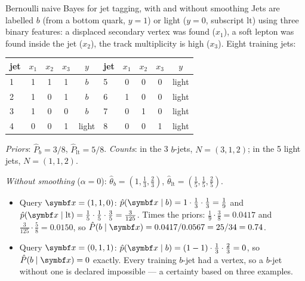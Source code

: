 \documentclass[11pt]{article}
\begin{document}
\begin{worked}{Bernoulli naive Bayes for jet tagging, with and without smoothing}
Jets are labelled $b$ (from a bottom quark, $y = 1$) or light ($y = 0$, subscript $\mathrm{lt}$) using three binary features: a displaced
secondary vertex was found ($x_1$), a soft lepton was found inside the jet ($x_2$), the track multiplicity is high
($x_3$). Eight training jets:

\begin{center}\small
\begin{tabular}{@{}lcccc@{\qquad}lcccc@{}}\toprule
jet & $x_1$ & $x_2$ & $x_3$ & $y$ & jet & $x_1$ & $x_2$ & $x_3$ & $y$ \\ \midrule
1 & 1 & 1 & 1 & $b$ & 5 & 0 & 0 & 0 & light \\
2 & 1 & 0 & 1 & $b$ & 6 & 1 & 0 & 0 & light \\
3 & 1 & 0 & 0 & $b$ & 7 & 0 & 1 & 0 & light \\
4 & 0 & 0 & 1 & light & 8 & 0 & 0 & 1 & light \\ \bottomrule
\end{tabular}
\end{center}

\emph{Priors}: $\hat P_b = 3/8$, $\hat P_{\mathrm{lt}} = 5/8$.
\emph{Counts}: in the 3 $b$-jets, $N = (3, 1, 2)$; in the 5 light jets, $N = (1, 1, 2)$.

\emph{Without smoothing} ($\alpha = 0$): $\hat\theta_b = (1, \tfrac13, \tfrac23)$, $\hat\theta_{\mathrm{lt}} = (\tfrac15, \tfrac15, \tfrac25)$.
\begin{itemize}
\item Query $\x = (1, 1, 0)$: $\hat p(\x \mid b) = 1 \cdot \tfrac13 \cdot \tfrac13 = \tfrac19$ and
$\hat p(\x \mid \mathrm{lt}) = \tfrac15 \cdot \tfrac15 \cdot \tfrac35 = \tfrac{3}{125}$. Times the priors: $\tfrac19 \cdot \tfrac38 = 0.0417$ and
$\tfrac{3}{125} \cdot \tfrac58 = 0.0150$, so $\hat P(b \mid \x) = 0.0417/0.0567 = 25/34 = 0.74$.
\item Query $\x = (0, 1, 1)$: $\hat p(\x \mid b) = (1 - 1) \cdot \tfrac13 \cdot \tfrac23 = 0$, so $\hat P(b \mid \x) = 0$
exactly. Every training $b$-jet had a vertex, so a $b$-jet without one is declared impossible --- a certainty
based on three examples.
\end{itemize}


\end{worked}
\end{document}
